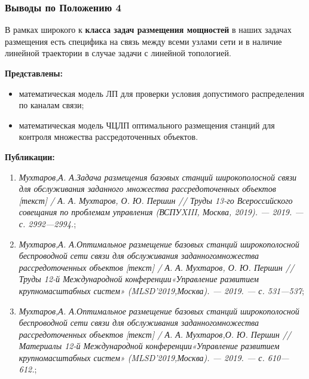 \begin{frame}
    \frametitle{Выводы по Положению 4}
    \fontsize{8pt}{7.2}\selectfont

    В рамках широкого к \textbf{класса задач размещения мощностей} в наших задачах размещения есть специфика на связь между всеми узлами сети и в  наличие линейной траектории в случае задачи с линейной топологией. 
    \bigskip

    \textbf{Представлены:}
    \begin{itemize}
        \item математическая модель ЛП для проверки условия допустимого распределения по каналам связи;
        \item математическая модель ЧЦЛП оптимального размещения станций для контроля множества рассредоточенных объектов.
    \end{itemize}

    \bigskip
    \textbf{Публикации:}
    \begin{minipage}[c]{1\linewidth}
        \fontsize{6pt}{7.2}\selectfont
        \begin{enumerate}
            \item \textit{Мухтаров,А. А.Задача размещения базовых станций широкопо­лосной связи для обслуживания заданного множества рассредото­ченных объектов [текст] / А. А. Мухтаров, О. Ю. Першин // Труды 13-го Всероссийского совещания по проблемам управления (ВСПУXIII, Москва, 2019). — 2019. — с. 2992—2994.};
            
            \item \textit{Мухтаров,А. А.Оптимальное размещение базовых станций широ­кополосной беспроводной сети связи для обслуживания заданногомножества рассредоточенных объектов [текст] / А. А. Мухта­ров, О. Ю. Першин // Труды 12-й Международной конференции«Управление развитием крупномасштабных систем» (MLSD’2019,Москва). — 2019. — с. 531—537};
            
            \item \textit{Мухтаров,А. А.Оптимальное размещение базовых станций широ­кополосной беспроводной сети связи для обслуживания заданногомножества рассредоточенных объектов [текст] / А. А. Мухтаров,О. Ю. Першин // Материалы 12-й Международной конференции«Управление развитием крупномасштабных систем» (MLSD’2019,Москва). — 2019. — с. 610—612.};
            
        \end{enumerate}
    \end{minipage}

\end{frame}


